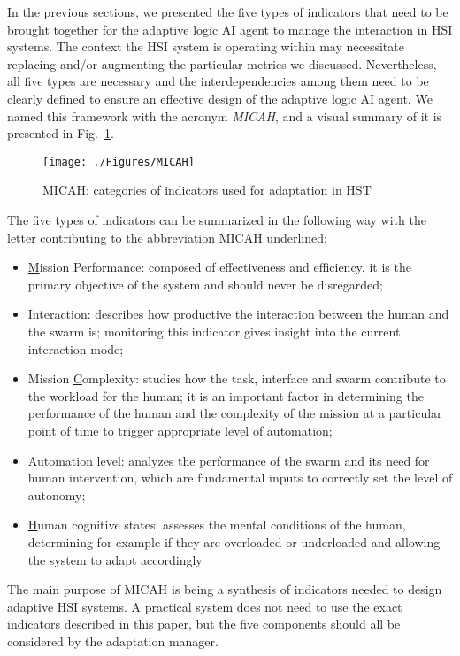 \documentclass[journal]{IEEEtran}
\begin{document}
In the previous sections, we presented the five types of indicators that need to be brought together for the adaptive logic AI agent to manage the interaction in HSI systems. 
The context the HSI system is operating within may necessitate replacing and/or augmenting the particular metrics we discussed.
Nevertheless, all five types are necessary and the interdependencies among them need to be clearly defined to ensure an effective design of the adaptive logic AI agent. 
We named this framework with the acronym \textit{MICAH}, and a visual summary of it is presented in Fig.~\ref{fig:MICAH}.
\begin{figure}[tp]
\centering
\texttt{[image: ./Figures/MICAH]}
\caption{MICAH: categories of indicators used for adaptation in HST}
\label{fig:MICAH}
\end{figure}
The five types of indicators can be summarized in the following way with the letter contributing to the abbreviation MICAH underlined:

\begin{itemize}
  \item \underline{M}ission Performance: composed of effectiveness and efficiency, it is the primary objective of the system and should never be disregarded;

  \item \underline{I}nteraction: describes how productive the interaction between the human and the swarm is; monitoring this indicator gives insight into the current interaction mode;

  \item Mission \underline{C}omplexity: studies how the task, interface and swarm contribute to the workload for the human; it is an important factor in determining the performance of the human and the complexity of the mission at a particular point of time to trigger appropriate level of automation;

  \item \underline{A}utomation level: analyzes the performance of the swarm and its need for human intervention, which are fundamental inputs to correctly set the level of autonomy;

  \item \underline{H}uman cognitive states: assesses the mental conditions of the human, determining for example if they are overloaded or underloaded and allowing the system to adapt accordingly
\end{itemize}

The main purpose of MICAH is being a synthesis of indicators needed to design adaptive HSI systems. A practical system does not need to use the exact indicators described in this paper, but the five components should all be considered by the adaptation manager.
\end{document}
